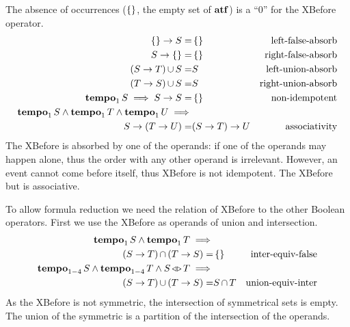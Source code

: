 \documentclass[en,twoside,onehalfspacing,phd]{risethesis}
\def\xbeforeop{\ensuremath\rightarrow}
\newcommand{\xbefore}[2]{\ensuremath #1 \xbeforeop #2 }
\def\tempoop{\ensuremath\operatorname{\mathbf{tempo}}}
\newcommand{\tempo}[2][1-4]{\ensuremath\tempoop_{#1} #2}
\def\independenteventsop{\ensuremath\operatorname{\triangleleft\triangleright}}
\newcommand{\independentevents}[2]{\ensuremath #1 \independenteventsop #2}
\def\False{\ensuremath\operatorname{\left\{\right\}}}
\def\algebraset{\ensuremath\operatorname{\mathbf{atf}}}
\newcommand{\parsin}[1]{\ensuremath\left( #1 \right)}
\def\union{\ensuremath\operatorname{\cup}}
\def\inter{\ensuremath\operatorname{\cap}}
\begin{document}
The absence of occurrences ($\False$, the empty set of $\algebraset$) is a ``0'' for the XBefore operator.
%
\begin{subequations}
\begin{align}
\xbefore{\False}{S} =&
  \False &
  \text{left-false-absorb}
  \label{thm:xbefore-of-false-1}\\
%
\xbefore{S}{\False} =&
  \False &
  \text{right-false-absorb}
  \label{thm:xbefore-of-false-2}\\
%
\left(\xbefore{S}{T}\right) \union S =& S &
  \text{left-union-absorb}
  \label{thm:xbefore-sup-absorb-1}\\
%
\left(\xbefore{T}{S}\right) \union S =& S &
  \text{right-union-absorb}
  \label{thm:xbefore-sup-absorb-2}\\
%
\tempo[1]{S} \implies
  \xbefore{S}{S} =&
  \False &
  \text{non-idempotent}
  \label{thm:xbefore-not-idempotent}\\
%
\tempo[1]{S}\land\tempo[1]{T}\land \tempo[1]{U}\implies&\nonumber\\
  \xbefore{S}{(\xbefore{T}{U})} =&
  \xbefore{(\xbefore{S}{T})}{U} &
  \text{associativity}
%
\end{align}
\end{subequations}
%
The XBefore is absorbed by one of the operands: if one of the operands may happen alone, thus the order with any other operand is irrelevant.
However, an event cannot come before itself, thus XBefore is not idempotent.
The XBefore but is associative.

To allow formula reduction we need the relation of XBefore to the other Boolean operators.
First we use the XBefore as operands of union and intersection.
%
\begin{subequations}
\begin{align}
\tempo[1]{S} \land \tempo[1]{T}\implies&\nonumber\\
  \parsin{\xbefore{S}{T}} \inter \parsin{\xbefore{T}{S}} =&
  \False &
  \text{inter-equiv-false}
  \label{thm:xbefore-inf-equiv-bot}\\
%
\tempo{S} \land \tempo{T} \land \independentevents{S}{T}\implies&\nonumber\\
  \parsin{\xbefore{S}{T}} \union \parsin{\xbefore{T}{S}} =&
  S \inter T &
  \text{union-equiv-inter}
  \label{thm:xbefore-sup-equiv-inf}
%
\end{align}
\end{subequations}
%
As the XBefore is not symmetric, the intersection of symmetrical sets is empty.
The union of the symmetric is a partition of the intersection of the operands.
\end{document}

